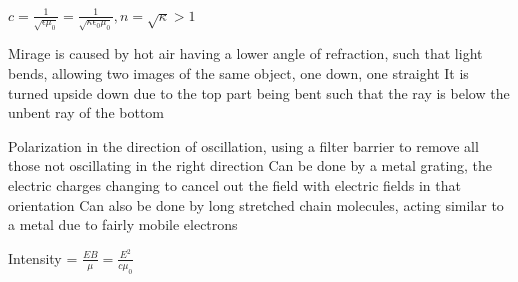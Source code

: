 \documentclass[11 pt, twoside]{article}
\begin{document}
$c = \frac{1}{\sqrt{\epsilon \mu_0}} = \frac{1}{\sqrt{\kappa \epsilon_0 \mu_0}}, n = \sqrt{\kappa} > 1$

Mirage is caused by hot air having a lower angle of refraction, such that light bends, allowing two images of the same object, one down, one straight
It is turned upside down due to the top part being bent such that the ray is below the unbent ray of the bottom

Polarization in the direction of oscillation, using a filter barrier to remove all those not oscillating in the right direction
Can be done by a metal grating, the electric charges changing to cancel out the field with electric fields in that orientation
Can also be done by long stretched chain molecules, acting similar to a metal due to fairly mobile electrons

Intensity = $\frac{EB}{\mu} = \frac{E^2}{c\mu_0}$
\end{document}
